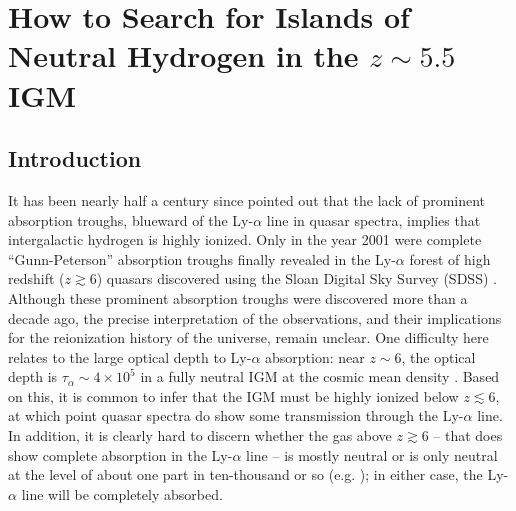 

\ifpdf
    \graphicspath{{neutral_islands/figures/PNG/}{example_chapter/figures/PDF/}{neutral_islands/figures/}}
\else
    \graphicspath{{neutral_islands/figures/EPS/}{neutral_islands/figures/}}
\fi


\chapter{How to Search for Islands of Neutral Hydrogen in the $z \sim 5.5$ IGM}\label{sec:NeutralIslands}
\section{Introduction} \label{sec:NeutralIslandsIntro}


It has been nearly half a century since \citet{1965ApJ...142.1633G} pointed out that the lack of prominent
absorption troughs, blueward of the Ly-$\alpha$ line in quasar spectra, implies that intergalactic
hydrogen is highly ionized. 
Only in the year 2001 were 
complete ``Gunn-Peterson'' absorption troughs finally revealed in 
the Ly-$\alpha$ forest of high redshift ($z \gtrsim 6$) quasars discovered using the Sloan Digital Sky Survey (SDSS)
\citep{Fan:2001ff,Becker:2001ee,Djorgovski:2001ez}. 
Although these prominent absorption troughs were discovered more than a decade ago, the precise interpretation
of the observations, and their implications for the reionization history of the universe,
remain unclear. One difficulty here relates to the large optical depth to
Ly-$\alpha$ absorption: near $z \sim 6$, the optical depth 
is $\tau_\alpha \sim 4 \times 10^5$ in a fully neutral IGM at the cosmic mean density \citep{1965ApJ...142.1633G}. Based on this, it is common to infer 
that the IGM must be highly ionized below $z \lesssim 6$,
at which point quasar spectra do show some transmission through the Ly-$\alpha$ line. In addition, it is clearly hard
to discern whether the gas above $z \gtrsim 6$ -- that does show complete absorption in the Ly-$\alpha$ line --
is mostly neutral or is only neutral at the level of about one part in ten-thousand or so (e.g. \citealt{Fan:2005es}); in either case,
the Ly-$\alpha$ line will be completely absorbed.

